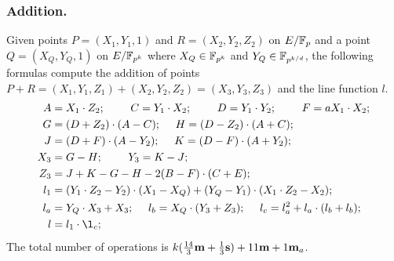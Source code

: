 \subsubsection{Addition.}
Given points $P = (X_1,Y_1,1)$ and $R = (X_2,Y_2,Z_2)$ on $E/\mathbb{F}_{p}$ and a point $Q = (X_Q,Y_Q,1)$ on $E/\mathbb{F}_{p^{k}}$
where $X_Q \in \mathbb{F}_{p^{k}}$ and $Y_Q \in \mathbb{F}_{p^{k/d}}$,
the following formulas compute the addition of points $P + R = (X_1,Y_1,Z_1) + (X_2,Y_2,Z_2) = (X_3,Y_3,Z_3)$ and the line function $l$.
\begin{align*}
A &= X_1 \cdot Z_2;\	\qquad
C = Y_1 \cdot X_2;\	\qquad
D = Y_1 \cdot Y_2;\	\qquad
F = a X_1 \cdot X_2;\\
G &= (D + Z_2) \cdot (A - C);\	\quad
H = (D - Z_2) \cdot (A + C);\\
J &= (D + F) \cdot (A - Y_2);\	\quad
K = (D - F) \cdot (A + Y_2);\\
X_3 &= G - H;\	\qquad
Y_3 = K - J;\\
Z_3 &= J + K - G - H - 2(B - F) \cdot (C + E);\\
l_1 &= (Y_1 \cdot Z_2 - Y_2) \cdot (X_1 - X_Q) + (Y_Q - Y_1) \cdot (X_1 \cdot Z_2 - X_2);\\
l_a &= Y_Q \cdot X_3 + X_3;\	\quad
l_b = X_Q \cdot (Y_3 + Z_3);\	\quad
l_c = l_a^2 + l_a \cdot (l_b + l_b);\\
l &= l_1 \cdot \l_c;
\end{align*}
The total number of operations is
$ k(\frac{14}{3}\textbf{m} + \frac{1}{3}\textbf{s}) + 11\textbf{m} + 1\textbf{m}_a$.


